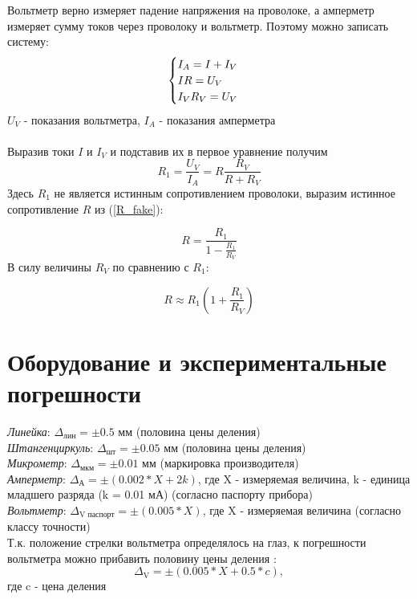 \documentclass{article}
\begin{document}
	Вольтметр верно измеряет падение напряжения на проволоке, а амперметр измеряет сумму токов через проволоку и вольтметр. Поэтому можно записать систему:\\
	\begin{equation}
		\begin{cases}
			$$ I_{A} = I + I_{V} $$\\
			$$IR = U_{V} $$\\
			$$I_{V}R_{V} = U_{V} $$
		\end{cases} 
	\end{equation}
	$U_{V}$ - показания вольтметра, $I_{A}$ - показания амперметра\\\\
	Выразив токи $I$ и $I_{V}$ и подставив их в первое уравнение получим\\
	\begin{equation}
		\label{R_fake}
		R_{\text{1}} = \frac{U_{V}}{I_{A}}= R\frac{R_{V}}{R+R_{V}}
	\end{equation}
	Здесь $R_{1}$ не является истинным сопротивлением проволоки, выразим истинное сопротивление $R$ из (\ref{R_fake}):
	
	$$R = \frac{R_{1}}{1 - \frac{R_{1}}{R_{V}}}$$
	В силу величины $R_{V}$ по сравнению с $R_{1}$:
	
	\begin{equation}
		R \approx R_{1}(1 + \frac{R_{1}}{R_{V}})
	\end{equation}
	
	
	
	\section{Оборудование и экспериментальные погрешности}
	
	\emph{Линейка}: $\Delta_{\text{лин}} = \pm 0.5$ мм (половина цены деления)\\
	\emph{Штангенциркуль}: $\Delta_{\text{шт}} = \pm 0.05$ мм (половина цены деления)\\
	\emph{Микрометр}: $\Delta_{\text{мкм}} = \pm 0.01$ мм (маркировка производителя)\\
	\emph{Амперметр}: $\Delta_{\text{А}} = \pm (0.002 * X + 2k)$, где X - измеряемая величина, k - единица младшего разряда (k = 0.01 мА) (согласно паспорту прибора)\\
	\emph{Вольтметр}: $\Delta_{\text{V паспорт}} = \pm (0.005 * X)$, где X - измеряемая величина (согласно классу точности)\\
	Т.к. положение стрелки вольтметра определялось на глаз, к погрешности вольтметра можно прибавить половину цены деления :\\
	$$\Delta_{\text{V}} = \pm (0.005 * X + 0.5 * c),$$ где c - цена деления
	
\end{document}
